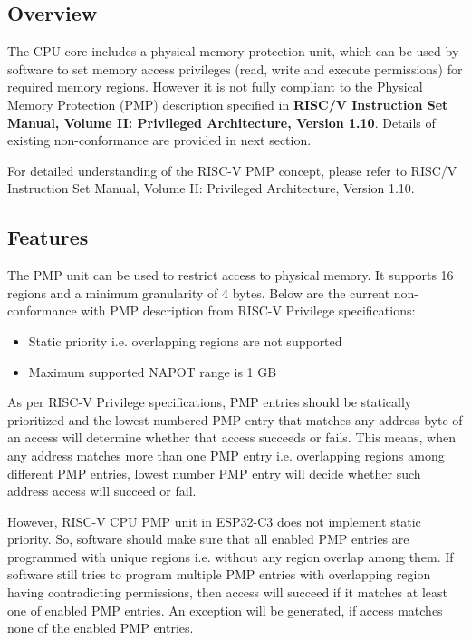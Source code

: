 \documentclass[main\_\_EN.tex]{subfiles}
\begin{document}
\subsection{Overview}
\label{sec:riscvcpu-pmp-overview}
The CPU core includes a physical memory protection unit, which can be used by software to set memory access privileges (read, write and execute permissions) for required memory regions. However it is not fully compliant to the  Physical Memory Protection (PMP) description specified in \textbf{RISC\-/V Instruction Set Manual, Volume II: Privileged Architecture, Version 1.10}. Details of existing non-conformance are provided in next section.

For detailed understanding of the RISC-V PMP concept, please refer to RISC\-/V Instruction Set Manual, Volume II: Privileged Architecture, Version 1.10.

\subsection{Features}
\label{sec:riscvcpu-pmp-features}
 The PMP unit can be used to restrict access to physical memory. It supports 16 regions and a minimum granularity of 4 bytes. Below are the current non-conformance with PMP description from RISC-V Privilege specifications:
\begin{itemize}
    \item {Static priority i.e. overlapping regions are not supported}
    \item {Maximum supported NAPOT range is 1 GB}
\end{itemize}

As per RISC-V Privilege specifications, PMP entries should be statically prioritized and the lowest-numbered PMP entry that matches any address byte of an access will determine whether that access succeeds or fails. This means, when any address matches more than one PMP entry i.e. overlapping regions among different PMP entries, lowest number PMP entry will decide whether such address access will succeed or fail. 

However, RISC-V CPU PMP unit in ESP32-C3 does not implement static priority. So, software should make sure that all enabled PMP entries are programmed with unique regions i.e. without any region overlap among them. If software still tries to program multiple PMP entries with overlapping region having contradicting permissions, then access will succeed if it matches at least one of enabled PMP entries. An exception will be generated, if access matches none of the enabled PMP entries.
\end{document}
